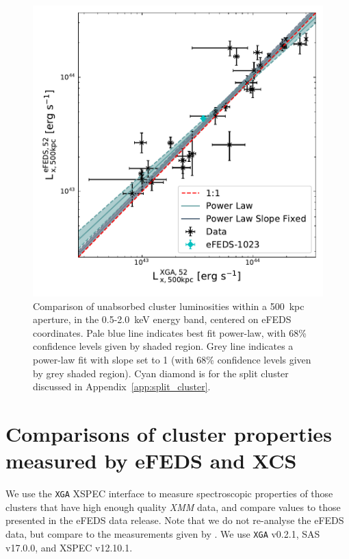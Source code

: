 \documentclass[fleqn,usenatbib]{mnras}
\begin{document}
\begin{figure}
    \centering
    \includegraphics[width=0.95\columnwidth]{images/efeds_xcs_l500cal.pdf}
    \caption[]{Comparison of unabsorbed cluster luminosities within a 500~kpc aperture, in the 0.5-2.0~keV energy band, centered on eFEDS coordinates. Pale blue line indicates best fit power-law, with 68\% confidence levels given by shaded region. Grey line indicates a power-law fit with slope set to 1 (with 68\% confidence levels given by grey shaded region). Cyan diamond is for the split cluster discussed in Appendix~\ref{app:split_cluster}.}
    \label{fig:l500kpccomp}
\end{figure}

\section{Comparisons of cluster properties measured by \lowercase{e}FEDS and XCS}
\label{sec:meascomp}

We use the \texttt{XGA} \citep[][]{xgapaper} XSPEC \citep[][]{xspec} interface to measure spectroscopic properties of those clusters that have high enough quality {\em XMM} data, and compare values to those presented in the eFEDS data release. Note that we do not re-analyse the eFEDS data, but compare to the measurements given by \cite{efedsclustercat}. We use \texttt{XGA} v0.2.1, SAS v17.0.0, and XSPEC v12.10.1.
\end{document}
